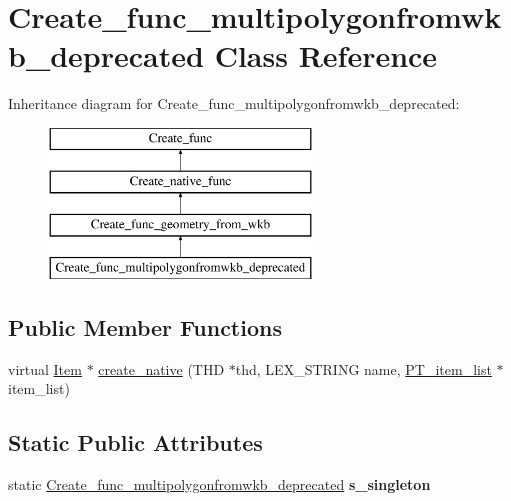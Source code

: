 \hypertarget{classCreate__func__multipolygonfromwkb__deprecated}{}\section{Create\+\_\+func\+\_\+multipolygonfromwkb\+\_\+deprecated Class Reference}
\label{classCreate__func__multipolygonfromwkb__deprecated}
Inheritance diagram for Create\+\_\+func\+\_\+multipolygonfromwkb\+\_\+deprecated\+:\begin{figure}[H]
\begin{center}
\leavevmode
\includegraphics[height=4.000000cm]{classCreate__func__multipolygonfromwkb__deprecated}
\end{center}
\end{figure}
\subsection*{Public Member Functions}
\begin{DoxyCompactItemize}
\item 
virtual \mbox{\hyperlink{classItem}{Item}} $\ast$ \mbox{\hyperlink{classCreate__func__multipolygonfromwkb__deprecated_a81e85bfb32c7c2bbad16e0d0c3fe9b95}{create\+\_\+native}} (T\+HD $\ast$thd, L\+E\+X\+\_\+\+S\+T\+R\+I\+NG name, \mbox{\hyperlink{classPT__item__list}{P\+T\+\_\+item\+\_\+list}} $\ast$item\+\_\+list)
\end{DoxyCompactItemize}
\subsection*{Static Public Attributes}
\begin{DoxyCompactItemize}
\item 
\mbox{\label{classCreate__func__multipolygonfromwkb__deprecated_a0be1f9efbb1dffb2e15faf0def45776f}} 
static \mbox{\hyperlink{classCreate__func__multipolygonfromwkb__deprecated}{Create\+\_\+func\+\_\+multipolygonfromwkb\+\_\+deprecated}} {\bfseries s\+\_\+singleton}
\end{DoxyCompactItemize}
